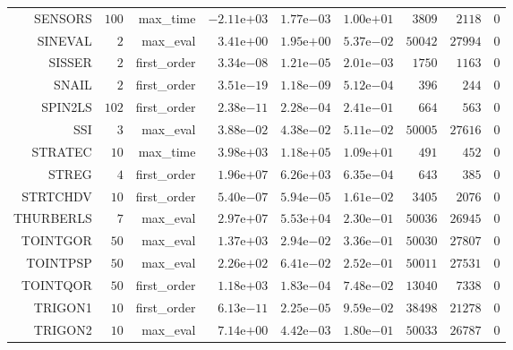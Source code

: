 \begin{longtable}{rrrrrrrrr}
SENSORS & \(   100\) & max\_time & \(-2.11\)e\(+03\) & \( 1.77\)e\(-03\) & \( 1.00\)e\(+01\) & \(  3809\) & \(  2118\) & \(     0\) \\
SINEVAL & \(     2\) & max\_eval & \( 3.41\)e\(+00\) & \( 1.95\)e\(+00\) & \( 5.37\)e\(-02\) & \( 50042\) & \( 27994\) & \(     0\) \\
SISSER & \(     2\) & first\_order & \( 3.34\)e\(-08\) & \( 1.21\)e\(-05\) & \( 2.01\)e\(-03\) & \(  1750\) & \(  1163\) & \(     0\) \\
SNAIL & \(     2\) & first\_order & \( 3.51\)e\(-19\) & \( 1.18\)e\(-09\) & \( 5.12\)e\(-04\) & \(   396\) & \(   244\) & \(     0\) \\
SPIN2LS & \(   102\) & first\_order & \( 2.38\)e\(-11\) & \( 2.28\)e\(-04\) & \( 2.41\)e\(-01\) & \(   664\) & \(   563\) & \(     0\) \\
SSI & \(     3\) & max\_eval & \( 3.88\)e\(-02\) & \( 4.38\)e\(-02\) & \( 5.11\)e\(-02\) & \( 50005\) & \( 27616\) & \(     0\) \\
STRATEC & \(    10\) & max\_time & \( 3.98\)e\(+03\) & \( 1.18\)e\(+05\) & \( 1.09\)e\(+01\) & \(   491\) & \(   452\) & \(     0\) \\
STREG & \(     4\) & first\_order & \( 1.96\)e\(+07\) & \( 6.26\)e\(+03\) & \( 6.35\)e\(-04\) & \(   643\) & \(   385\) & \(     0\) \\
STRTCHDV & \(    10\) & first\_order & \( 5.40\)e\(-07\) & \( 5.94\)e\(-05\) & \( 1.61\)e\(-02\) & \(  3405\) & \(  2076\) & \(     0\) \\
THURBERLS & \(     7\) & max\_eval & \( 2.97\)e\(+07\) & \( 5.53\)e\(+04\) & \( 2.30\)e\(-01\) & \( 50036\) & \( 26945\) & \(     0\) \\
TOINTGOR & \(    50\) & max\_eval & \( 1.37\)e\(+03\) & \( 2.94\)e\(-02\) & \( 3.36\)e\(-01\) & \( 50030\) & \( 27807\) & \(     0\) \\
TOINTPSP & \(    50\) & max\_eval & \( 2.26\)e\(+02\) & \( 6.41\)e\(-02\) & \( 2.52\)e\(-01\) & \( 50011\) & \( 27531\) & \(     0\) \\
TOINTQOR & \(    50\) & first\_order & \( 1.18\)e\(+03\) & \( 1.83\)e\(-04\) & \( 7.48\)e\(-02\) & \( 13040\) & \(  7338\) & \(     0\) \\
TRIGON1 & \(    10\) & first\_order & \( 6.13\)e\(-11\) & \( 2.25\)e\(-05\) & \( 9.59\)e\(-02\) & \( 38498\) & \( 21278\) & \(     0\) \\
TRIGON2 & \(    10\) & max\_eval & \( 7.14\)e\(+00\) & \( 4.42\)e\(-03\) & \( 1.80\)e\(-01\) & \( 50033\) & \( 26787\) & \(     0\) \\

\end{longtable}
